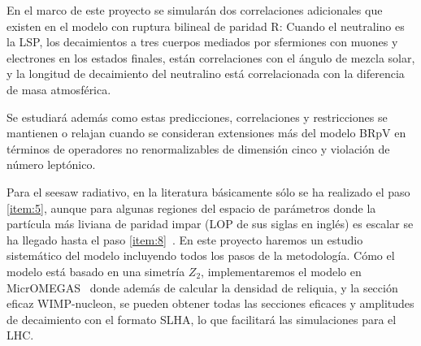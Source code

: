 \begin{brpvlhc}
  En el marco de este proyecto se simularán dos correlaciones
  adicionales que existen en el modelo con ruptura bilineal de paridad R:
  Cuando el neutralino es la LSP, los decaimientos a tres cuerpos
  mediados por sfermiones con muones y electrones en los estados
  finales, están correlaciones con el ángulo de mezcla solar, y la
  longitud de decaimiento del neutralino está correlacionada con la
  diferencia de masa atmosférica.
\end{brpvlhc}

\begin{bbrpvlhc}
   Se estudiará además como estas predicciones, correlaciones y
   restricciones se mantienen o relajan cuando se consideran
   extensiones más del modelo BRpV en términos de operadores no
   renormalizables de dimensión cinco y violación de número leptónico.  
\end{bbrpvlhc}

\begin{darkmatter}
  Para el seesaw radiativo, en la literatura básicamente sólo se ha
  realizado el paso \ref{item:5}, aunque para algunas regiones del
  espacio de parámetros donde la partícula más liviana de paridad
  impar (LOP de sus siglas en inglés) es escalar se ha llegado hasta
  el paso \ref{item:8}~\cite{Bergman:2007pm}. En este proyecto haremos un
  estudio sistemático del modelo incluyendo todos los pasos de la
  metodología. Cómo el modelo está basado en una simetría $Z_2$,
  implementaremos el modelo en MicrOMEGAS~\cite{Belanger:2010gh} donde
  además de calcular la densidad de reliquia, y la sección eficaz
  WIMP-nucleon, se pueden obtener todas las secciones eficaces y
  amplitudes de decaimiento con el formato SLHA, lo que facilitará las
  simulaciones para el LHC.
\end{darkmatter}





